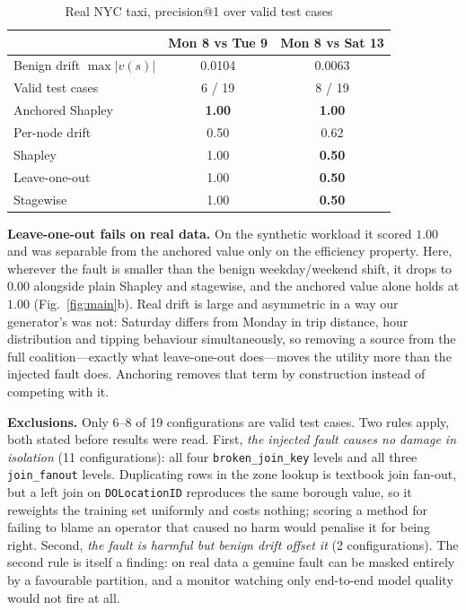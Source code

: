 \documentclass[conference]{IEEEtran}
\begin{document}
\begin{table}[t]
\caption{Real NYC taxi, precision@1 over valid test cases}
\label{tab:real}
\centering
\begin{tabular}{lcc}
\toprule
 & Mon 8 vs Tue 9 & Mon 8 vs Sat 13 \\
\midrule
Benign drift $\max|v(s)|$ & 0.0104 & 0.0063 \\
Valid test cases          & 6 / 19 & 8 / 19 \\
\midrule
Anchored Shapley          & \textbf{1.00} & \textbf{1.00} \\
Per-node drift            & 0.50 & 0.62 \\
Shapley                   & 1.00 & \textbf{0.50} \\
Leave-one-out             & 1.00 & \textbf{0.50} \\
Stagewise                 & 1.00 & \textbf{0.50} \\
\bottomrule
\end{tabular}
\end{table}

\textbf{Leave-one-out fails on real data.} On the synthetic workload it scored
$1.00$ and was separable from the anchored value only on the efficiency property.
Here, wherever the fault is smaller than the benign weekday/weekend shift, it
drops to $0.00$ alongside plain Shapley and stagewise, and the anchored value
alone holds at $1.00$ (Fig.~\ref{fig:main}b). Real drift is large and asymmetric
in a way our generator's was not: Saturday differs from Monday in trip distance,
hour distribution and tipping behaviour simultaneously, so removing a source from
the full coalition---exactly what leave-one-out does---moves the utility more
than the injected fault does. Anchoring removes that term by construction instead
of competing with it.

\textbf{Exclusions.} Only 6--8 of 19 configurations are valid test cases. Two
rules apply, both stated before results were read. First, \emph{the injected
fault causes no damage in isolation} (11 configurations): all four
\texttt{broken\_join\_key} levels and all three \texttt{join\_fanout} levels.
Duplicating rows in the zone lookup is textbook join fan-out, but a left join on
\texttt{DOLocationID} reproduces the same borough value, so it reweights the
training set uniformly and costs nothing; scoring a method for failing to blame
an operator that caused no harm would penalise it for being right. Second,
\emph{the fault is harmful but benign drift offset it} (2 configurations). The
second rule is itself a finding: on real data a genuine fault can be masked
entirely by a favourable partition, and a monitor watching only end-to-end model
quality would not fire at all.
\end{document}
